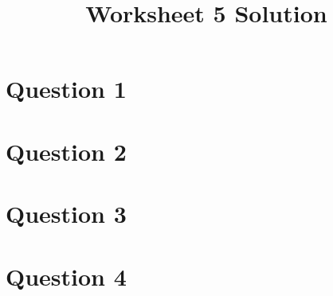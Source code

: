 \documentclass[12pt]{article}
\begin{document}
\title{Worksheet 5 Solution}
\maketitle

\section*{Question 1}

\section*{Question 2}

\section*{Question 3}

\section*{Question 4}
\end{document}

